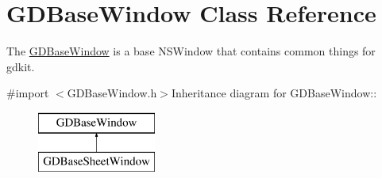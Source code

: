 \hypertarget{interface_g_d_base_window}{
\section{GDBaseWindow Class Reference}
\label{interface_g_d_base_window}
}


The \hyperlink{interface_g_d_base_window}{GDBaseWindow} is a base NSWindow that contains common things for gdkit.  


{\ttfamily \#import $<$GDBaseWindow.h$>$}Inheritance diagram for GDBaseWindow::\begin{figure}[H]
\begin{center}
\leavevmode
\includegraphics[height=2cm]{interface_g_d_base_window}
\end{center}
\end{figure}
